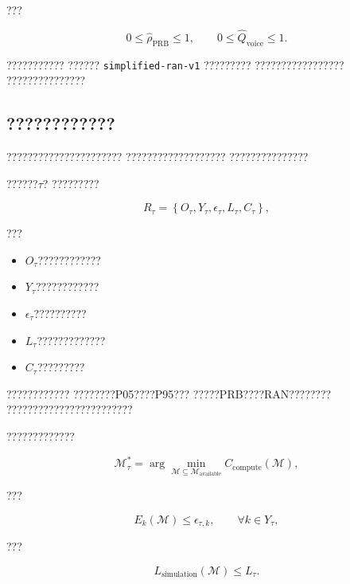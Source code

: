 ???

\begin{equation}
0\leq
\hat{\rho}_{\mathrm{PRB}}
\leq1,
\qquad
0\leq
\hat{Q}_{\mathrm{voice}}
\leq1.
\label{eq:normalized_physical_constraints}
\end{equation}

???????????
??????
\texttt{simplified-ran-v1}
?????????
?????????????????
???????????????


\subsection*{????????????}

??????????????????????
???????????????????
???????????????

??????$\tau$?
?????????

\begin{equation}
R_{\tau}
=
\left\{
O_{\tau},
Y_{\tau},
\epsilon_{\tau},
L_{\tau},
C_{\tau}
\right\},
\label{eq:task_model_requirement}
\end{equation}

???

\begin{itemize}
    \item $O_{\tau}$????????????
    \item $Y_{\tau}$????????????
    \item $\epsilon_{\tau}$??????????
    \item $L_{\tau}$?????????????
    \item $C_{\tau}$?????????
\end{itemize}

????????????
????????P05????P95???
?????PRB????RAN????????
????????????????????????

?????????????

\begin{equation}
\mathcal{M}_{\tau}^{*}
=
\arg\min_{\mathcal{M}\subseteq\mathcal{M}_{\mathrm{available}}}
C_{\mathrm{compute}}(\mathcal{M}),
\label{eq:task_oriented_model_selection}
\end{equation}

???

\begin{equation}
E_k(\mathcal{M})
\leq
\epsilon_{\tau,k},
\qquad
\forall k\in Y_{\tau},
\label{eq:model_accuracy_requirement}
\end{equation}

???

\begin{equation}
L_{\mathrm{simulation}}(\mathcal{M})
\leq
L_{\tau}.
\label{eq:model_latency_requirement}
\end{equation}

